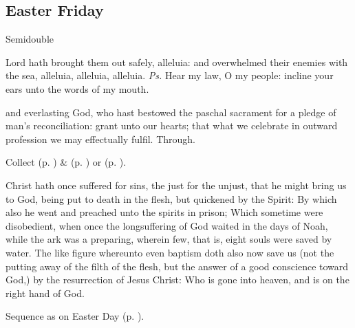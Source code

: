 \subsection{Easter Friday}
\begin{inhead}
    {Semidouble}
\end{inhead}


\introit
{} Lord hath brought them out safely, alleluia: and overwhelmed their enemies with the sea, alleluia, alleluia, alleluia. \textit{Ps.} Hear my law, O my people: incline your ears unto the words of my mouth.

\collect
{} and everlasting God, who hast bestowed the paschal sacrament for a pledge of man's reconciliation: grant unto our hearts; that what we celebrate in outward profession we may effectually fulfil. Through.
\begin{rubric}
     Collect  (p. \pageref{EasterCollect}) \&   (p. \pageref{SPAgainst}) or  (p. \pageref{SPChiefBishop}).
\end{rubric}

 Christ hath once suffered for sins, the just for the unjust, that he might bring us to God, being put to death in the flesh, but quickened by the Spirit: By which also he went and preached unto the spirits in prison; Which sometime were disobedient, when once the longsuffering of God waited in the days of Noah, while the ark was a preparing, wherein few, that is, eight souls were saved by water. The like figure whereunto even baptism doth also now save us (not the putting away of the filth of the flesh, but the answer of a good conscience toward God,) by the resurrection of Jesus Christ: Who is gone into heaven, and is on the right hand of God.


\begin{rubric}
    Sequence as on Easter Day (p. \pageref{PaschalSequence}).
\end{rubric}

